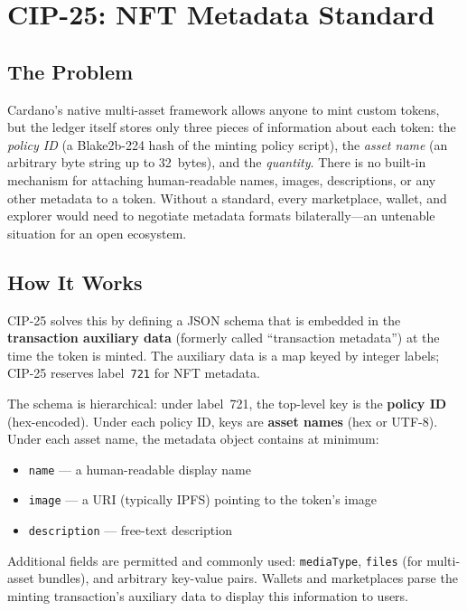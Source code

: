 \section{CIP-25: NFT Metadata Standard}
\label{sec:cip25}

\subsection{The Problem}

Cardano's native multi-asset framework allows anyone to mint custom tokens,
but the ledger itself stores only three pieces of information about each
token: the \emph{policy ID} (a Blake2b-224 hash of the minting policy script),
the \emph{asset name} (an arbitrary byte string up to 32~bytes), and the
\emph{quantity}.  There is no built-in mechanism for attaching human-readable
names, images, descriptions, or any other metadata to a token.  Without a
standard, every marketplace, wallet, and explorer would need to negotiate
metadata formats bilaterally---an untenable situation for an open ecosystem.

\subsection{How It Works}

CIP-25 solves this by defining a JSON schema that is embedded in the
\textbf{transaction auxiliary data} (formerly called ``transaction metadata'')
at the time the token is minted.  The auxiliary data is a map keyed by
integer labels; CIP-25 reserves label~\texttt{721} for NFT metadata.

The schema is hierarchical: under label~721, the top-level key is the
\textbf{policy ID} (hex-encoded).  Under each policy ID, keys are
\textbf{asset names} (hex or UTF-8).  Under each asset name, the metadata
object contains at minimum:

\begin{itemize}[nosep]
  \item \texttt{name} --- a human-readable display name
  \item \texttt{image} --- a URI (typically IPFS) pointing to the token's
    image
  \item \texttt{description} --- free-text description
\end{itemize}

Additional fields are permitted and commonly used: \texttt{mediaType},
\texttt{files} (for multi-asset bundles), and arbitrary key-value pairs.
Wallets and marketplaces parse the minting transaction's auxiliary data to
display this information to users.

